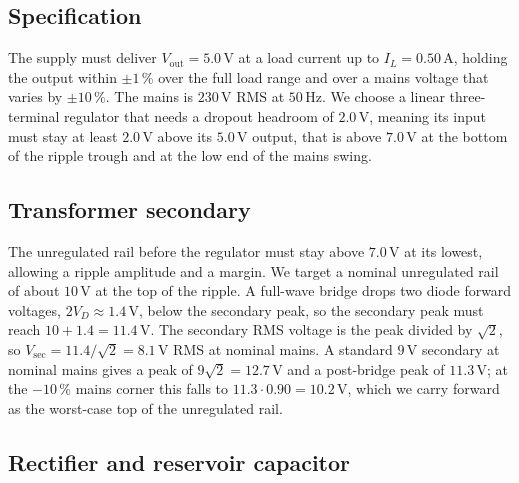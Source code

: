 

\subsection{Specification}

The supply must deliver $V_{\text{out}} = 5.0\,\si{\volt}$ at a load
current up to $I_{L} = 0.50\,\si{\ampere}$, holding the output within
$\pm 1\,\%$ over the full load range and over a mains voltage that
varies by $\pm 10\,\%$. The mains is $230\,\si{\volt}$ RMS at
$50\,\si{\hertz}$. We choose a linear three-terminal regulator that
needs a dropout headroom of $2.0\,\si{\volt}$, meaning its input must
stay at least $2.0\,\si{\volt}$ above its $5.0\,\si{\volt}$ output, that
is above $7.0\,\si{\volt}$ at the bottom of the ripple trough and at the
low end of the mains swing.

\subsection{Transformer secondary}

The unregulated rail before the regulator must stay above
$7.0\,\si{\volt}$ at its lowest, allowing a ripple amplitude and a
margin. We target a nominal unregulated rail of about $10\,\si{\volt}$
at the top of the ripple. A full-wave bridge drops two diode forward
voltages, $2V_{D}\approx 1.4\,\si{\volt}$, below the secondary peak, so
the secondary peak must reach $10 + 1.4 = 11.4\,\si{\volt}$. The
secondary RMS voltage is the peak divided by $\sqrt{2}$, so
$V_{\text{sec}} = 11.4/\sqrt{2} = 8.1\,\si{\volt}$ RMS at nominal mains.
A standard $9\,\si{\volt}$ secondary at nominal mains gives a peak of
$9\sqrt{2} = 12.7\,\si{\volt}$ and a post-bridge peak of $11.3\,\si{
\volt}$; at the $-10\,\%$ mains corner this falls to $11.3\cdot 0.90 =
10.2\,\si{\volt}$, which we carry forward as the worst-case top of the
unregulated rail.

\subsection{Rectifier and reservoir capacitor}


